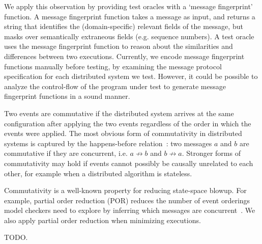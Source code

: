 We apply this observation by providing test oracles with a `message fingerprint' function.
A message fingerprint function takes a message as input,
and returns a string that identifies the (domain-specific) relevant fields of the message, but masks over
semantically extraneous fields (e.g. sequence numbers). A test oracle uses the
message fingerprint function to reason about the similarities and differences
between two executions. Currently, we encode message fingerprint functions
manually before testing, by examining the message protocol specification for each distributed
system we test. However, it could be possible to analyze the control-flow of
the program under test to generate message fingerprint functions in a sound
manner.

 Two events are commutative if the distributed
system arrives at the same configuration after applying the two events
regardless of the order in which the events were applied. The most obvious
form of commutativity in distributed systems is captured by the happens-before
relation~\cite{Lamport:1978:TCO:359545.359563}: two messages $a$ and $b$ are commutative if they are concurrent, i.e.
$a \not\rightarrow b$ and $b \not\rightarrow a$. Stronger forms of
commutativity may hold if events cannot possibly be causally unrelated to each other, for
example when a distributed algorithm is stateless.

Commutativity is a well-known property for reducing state-space
blowup. For example, partial order
reduction (POR) reduces the number of event orderings model checkers need to
explore by inferring which messages are concurrent~\cite{godefroid1995partial,flanagan2005dynamic}.
We also apply partial order reduction when minimizing executions.

 TODO.


